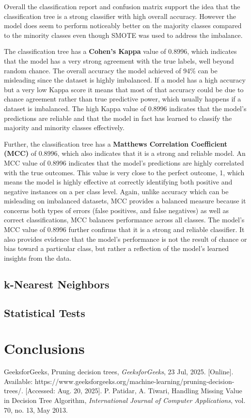 \documentclass[conference]{IEEEtran}
\begin{document}
Overall the classification report and confusion matrix support the idea that the classification tree is a strong classifier with high overall accuracy. However the model does seem to perform noticeably better on the majority classes compared to the minority classes even though SMOTE was used to address the imbalance.

The classification tree has a \textbf{Cohen's Kappa} value of 0.8996, which indicates that the model has a very strong agreement with the true labels, well beyond random chance. The overall accuracy the model achieved of 94\% can be misleading since the dataset is highly imbalanced. If a model has a high accuracy but a very low Kappa score it means that most of that accuracy could be due to chance agreement rather than true predictive power, which usually happens if a dataset is imbalanced. The high Kappa value of 0.8996 indicates that the model's predictions are reliable and that the model in fact has learned to classify the majority and minority classes effectively.

Further, the classification tree has a \textbf{Matthews Correlation Coefficient (MCC)} of 0.8996, which also indicates that it is a strong and reliable model. An MCC value of 0.8996 indicates that the model's predictions are highly correlated with the true outcomes. This value is very close to the perfect outcome, 1, which means the model is highly effective at correctly identifying both positive and negative instances on a per class level. Again, unlike accuracy which can be misleading on imbalanced datasets, MCC provides a balanced measure because it concerns both types of errors (false positives, and false negatives) as well as correct classifications, MCC balances performance across all classes. The model's MCC value of 0.8996 further confirms that it is a strong and reliable classifier. It also provides evidence that the model's performance is not the result of chance or bias toward a particular class, but rather a reflection of the model's learned insights from the data.

\subsection{\textbf{k-Nearest Neighbors}}

\subsection{\textbf{Statistical Tests}}

\section{\textbf{Conclusions}}

\begin{thebibliography}{00}
 GeeksforGeeks, Pruning decision trees, {\em GeeksforGeeks}, 23 Jul, 2025. [Online]. Available: https://www.geeksforgeeks.org/machine-learning/pruning-decision-trees/. [Accessed: Aug. 20, 2025].
 P. Patidar, A. Tiwari, Handling Missing Value in Decision Tree Algorithm, {\em International Journal of Computer Applications}, vol. 70, no. 13, May 2013.
\end{thebibliography}
\vspace{12pt}
\end{document}
